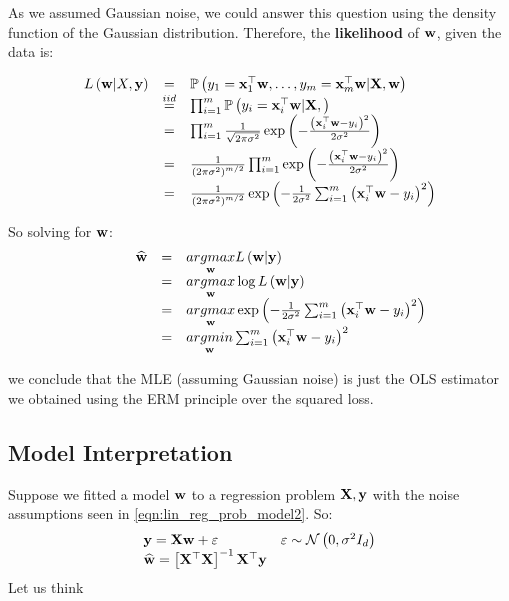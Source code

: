 As we assumed Gaussian noise, we could answer this question using the density function of the Gaussian distribution. %
Therefore, the \textbf{likelihood} of $\mathbf{w}$, given the data is:

$$
\begin{array}{ccl}
L\left(\mathbf{w}|X,\mathbf{y}\right) & = & \mathbb{P}\left(y_{1}=\mathbf{x}_{1}^{\top}\mathbf{w},\ldots,y_{m}=\mathbf{x}_{m}^{\top}\mathbf{w}|\mathbf{X},\mathbf{w}\right) \\
& \overset{iid}{=} & \prod_{i=1}^{m}\mathbb{P}\left(y_{i}=\mathbf{x}_{i}^{\top}\mathbf{w}|\mathbf{X},\right) \\
& = & \prod_{i=1}^{m}\frac{1}{\sqrt{2\pi\sigma^{2}}}\exp\left(-\frac{\left(\mathbf{x}_{i}^{\top}\mathbf{w}-y_{i}\right)^{2}}{2\sigma^{2}}\right) \\
& = & \frac{1}{\left(2\pi\sigma^{2}\right)^{m/2}}\prod_{i=1}^{m}\exp\left(-\frac{\left(\mathbf{x}_{i}^{\top}\mathbf{w}-y_{i}\right)^{2}}{2\sigma^{2}}\right)\\
& = & \frac{1}{\left(2\pi\sigma^{2}\right)^{m/2}}\exp\left(-\frac{1}{2\sigma^{2}}\sum_{i=1}^{m}\left(\mathbf{x}_{i}^{\top}\mathbf{w}-y_{i}\right)^{2}\right)
\end{array}
$$

So solving for $\mathbf{w}$:
$$ 
\begin{array}{ccl}
\quad\quad\quad\widehat{\mathbf{w}} & = & \underset{\mathbf{w}}{argmax}L\left(\mathbf{w}|\mathbf{y}\right) \\
& = & \underset{\mathbf{w}}{argmax}\log L\left(\mathbf{w}|\mathbf{y}\right) \\
& = & \underset{\mathbf{w}}{argmax}\exp\left(-\frac{1}{2\sigma^{2}}\sum_{i=1}^{m}\left(\mathbf{x}_{i}^{\top}\mathbf{w}-y_{i}\right)^{2}\right) \\ 
& = & \underset{\mathbf{w}}{argmin}\sum_{i=1}^{m}\left(\mathbf{x}_{i}^{\top}\mathbf{w}-y_{i}\right)^{2}
\end{array}
$$

we conclude that the MLE (assuming Gaussian noise) is just the OLS estimator we obtained using the ERM principle over the squared loss. %

\subsection{Model Interpretation}
Suppose we fitted a model $\mathbf{w}$ to a regression problem $\mathbf{X},\mathbf{y}$ with the noise assumptions seen in \ref{eqn:lin_reg_prob_model2}. So:
$$
\begin{array}{ll}
\mathbf{y}=\mathbf{X}\mathbf{w}+\varepsilon & \varepsilon \sim\mathcal{N}\left(0,\sigma^2I_d\right)\\
\widehat{\mathbf{w}} = \left[\mathbf{X}^\top\mathbf{X}\right]^{-1}\mathbf{X}^\top\mathbf{y} &
\end{array}
$$
Let us think 


